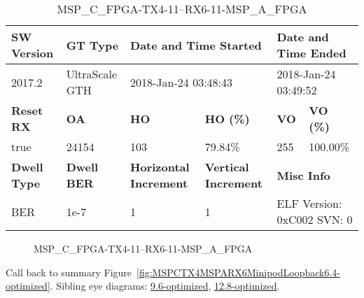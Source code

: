 \begin{table}[h]
\centering
\caption{MSP\_C\_FPGA-TX4-11--RX6-11-MSP\_A\_FPGA}
\label{tab:MSPCFPGATX411RX611MSPAFPGA6.4-optimized}
\begin{tabular}{@{}|l|l|l|l|l|l|@{}}
\toprule
\textbf{SW Version}                & \textbf{GT Type}   & \multicolumn{2}{l|}{\textbf{Date and Time Started}}            & \multicolumn{2}{l|}{\textbf{Date and Time Ended}}        \\ \midrule
2017.2                       & UltraScale GTH          & \multicolumn{2}{l|}{2018-Jan-24 03:48:43}                   & \multicolumn{2}{l|}{2018-Jan-24 03:49:52}               \\ \midrule
\textbf{Reset RX}                  & \textbf{OA} & \textbf{HO}   & \textbf{HO (\%)} & \textbf{VO} & \textbf{VO (\%)} \\ \midrule
true & 24154        & 103          & 79.84\%        & 255        & 100.00\%       \\ \midrule
\textbf{Dwell Type}                & \textbf{Dwell BER} & \textbf{Horizontal Increment} & \textbf{Vertical Increment}    & \multicolumn{2}{l|}{\textbf{Misc Info}}                  \\ \midrule
BER                            & 1e-7        & 1        & 1           & \multicolumn{2}{l|}{ELF Version: 0xC002 SVN: 0}                         \\ \bottomrule
\end{tabular}
\end{table}

\begin{figure}[h]
\caption{MSP\_C\_FPGA-TX4-11--RX6-11-MSP\_A\_FPGA} \label{fig:MSPCFPGATX411RX611MSPAFPGA6.4-optimized}
\end{figure}

Call back to summary Figure~\ref{fig:MSPCTX4MSPARX6MinipodLoopback6.4-optimized}.
Sibling eye diagrams: \hyperref[sec:MSPCFPGATX411RX611MSPAFPGA9.6-optimized]{9.6-optimized}, \hyperref[sec:MSPCFPGATX411RX611MSPAFPGA12.8-optimized]{12.8-optimized}.

\clearpage
\newpage

